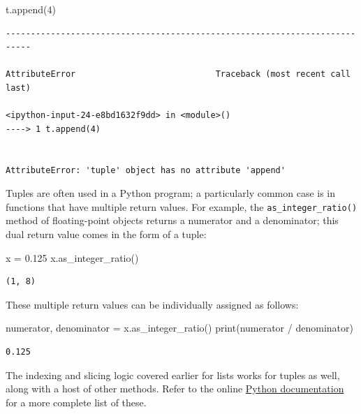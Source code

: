 \documentclass[]{article}
\newenvironment{Shaded}{}{}
\newcommand{\DecValTok}[1]{\textcolor[rgb]{0.25,0.63,0.44}{{#1}}}
\newcommand{\FloatTok}[1]{\textcolor[rgb]{0.25,0.63,0.44}{{#1}}}
\newcommand{\OperatorTok}[1]{\textcolor[rgb]{0.40,0.40,0.40}{{#1}}}
\newcommand{\BuiltInTok}[1]{{#1}}
\newcommand{\NormalTok}[1]{{#1}}
\begin{document}
\begin{Shaded}
\begin{Highlighting}[]
\NormalTok{t.append(}\DecValTok{4}\NormalTok{)}
\end{Highlighting}
\end{Shaded}

\begin{verbatim}
---------------------------------------------------------------------------

AttributeError                            Traceback (most recent call last)

<ipython-input-24-e8bd1632f9dd> in <module>()
----> 1 t.append(4)


AttributeError: 'tuple' object has no attribute 'append'
\end{verbatim}

Tuples are often used in a Python program; a particularly common case is
in functions that have multiple return values. For example, the
\texttt{as\_integer\_ratio()} method of floating-point objects returns a
numerator and a denominator; this dual return value comes in the form of
a tuple:

\begin{Shaded}
\begin{Highlighting}[]
\NormalTok{x }\OperatorTok{=} \FloatTok{0.125}
\NormalTok{x.as_integer_ratio()}
\end{Highlighting}
\end{Shaded}

\begin{verbatim}
(1, 8)
\end{verbatim}

These multiple return values can be individually assigned as follows:

\begin{Shaded}
\begin{Highlighting}[]
\NormalTok{numerator, denominator }\OperatorTok{=} \NormalTok{x.as_integer_ratio()}
\BuiltInTok{print}\NormalTok{(numerator }\OperatorTok{/} \NormalTok{denominator)}
\end{Highlighting}
\end{Shaded}

\begin{verbatim}
0.125
\end{verbatim}

The indexing and slicing logic covered earlier for lists works for
tuples as well, along with a host of other methods. Refer to the online
\href{https://docs.python.org/3/tutorial/datastructures.html}{Python
documentation} for a more complete list of these.
\end{document}
